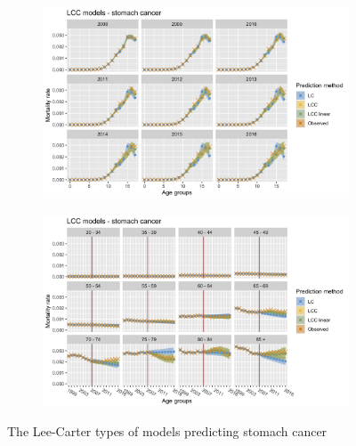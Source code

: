 \begin{figure}[h!]
    \centering
    \begin{subfigure}[b]{.45\linewidth}
        \includegraphics[width=\linewidth]{real-data/real-data-univariate/Figures/univariate-LCC-by-age-stomach.png}
    \end{subfigure}
    \begin{subfigure}[b]{.45\linewidth}
        \includegraphics[width=\linewidth]{real-data/real-data-univariate/Figures/univariate-LCC-by-period-stomach.png}
    \end{subfigure}
    \caption{The Lee-Carter types of models predicting stomach cancer}
    \label{fig:uv-LCC-stomach}
\end{figure}

